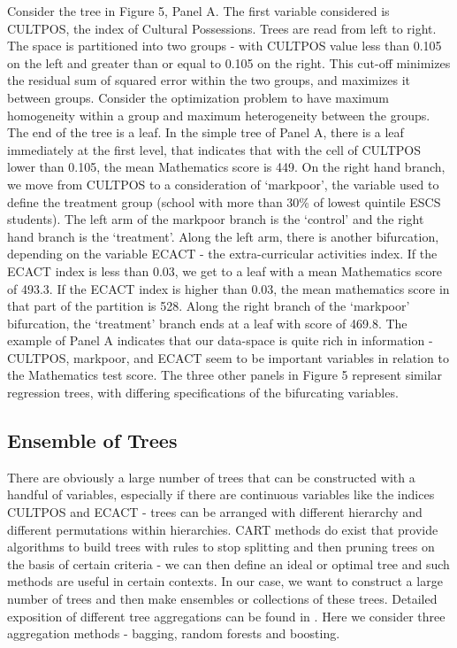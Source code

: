 \documentclass[alpha-refs,fleqn]{wiley-article_p2}
\begin{document}
Consider the tree in Figure 5, Panel A. The first variable considered is CULTPOS, the index of Cultural Possessions. Trees are read from left to right. The space is partitioned into two groups - with CULTPOS value less than 0.105 on the left and greater than or equal to 0.105 on the right. This cut-off minimizes the residual sum of squared error within the two groups, and maximizes it between groups. Consider the optimization problem to have maximum homogeneity within a group and maximum heterogeneity between the groups.  The end of the tree is a leaf. In the simple tree of Panel A, there is a leaf immediately at the first level, that indicates that with the cell of CULTPOS lower than 0.105, the mean Mathematics score is 449. On the right hand branch, we move from CULTPOS to a consideration of `markpoor', the variable used to define the treatment group (school with more than 30\% of lowest quintile ESCS students). The left arm of the markpoor branch is the `control' and the right hand branch is the `treatment'. Along the left arm, there is another bifurcation, depending on the variable ECACT - the extra-curricular activities index. If the ECACT index is less than 0.03, we get to a leaf with a mean Mathematics score of 493.3. If the ECACT index is higher than 0.03, the mean mathematics score in that part of the partition is 528. Along the right branch of the `markpoor' bifurcation, the `treatment' branch ends at a leaf with score of 469.8. The example of Panel A indicates that our data-space is quite rich in information - CULTPOS, markpoor, and ECACT seem to be important variables in relation to the Mathematics test score. The three other panels in Figure 5 represent similar regression trees, with differing specifications of the bifurcating variables. 

\subsection{Ensemble of Trees} 

There are obviously a large number of trees that can be constructed with a handful of variables, especially if there are continuous variables like the indices CULTPOS and ECACT - trees can be arranged with different hierarchy and different permutations within hierarchies. CART methods do exist that provide algorithms to build trees with rules to stop splitting and then pruning trees on the basis of certain criteria - we can then define an ideal or optimal tree and such methods are useful in certain contexts. In our case, we want to construct a large number of trees and then make ensembles or collections of these trees. Detailed exposition of different tree aggregations can be found in \cite{Hastie_2008}. Here we consider three aggregation methods - bagging, random forests and boosting. 
\end{document}
